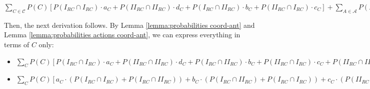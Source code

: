 \documentclass[fleqn,reqno,11pt]{article}
\begin{document}
\noindent $\sum_{C \in \mathcal{C}}P(C)[P(I_{RC}\cap I_{RC})\cdot a_{C}+P(II_{RC}\cap II_{RC})\cdot d_{C}+P(I_{RC}\cap II_{RC})\cdot b_{C}+P(II_{RC}\cap I_{RC})\cdot c_{C}]+\sum_{A \in \mathcal{A}}P(A)[P(I_{RA}\cap I_{RA})\cdot a_{A}+P(II_{RA}\cap II_{RA})\cdot d_{A}+P(I_{RA}\cap II_{RA})\cdot b_{A}+P(II_{RA}\cap I_{RA})\cdot c_{A}] > \sum_{C \in \mathcal{C}}P(C)[P(I_{RC}\cap I_{MC})\cdot a_{C}+P(II_{RC}\cap II_{MC})\cdot d_{C}+P(I_{RC}\cap II_{MC})\cdot c_{C}+P(II_{RC}\cap I_{MC})\cdot b_{C}]+\sum_{A \in \mathcal{A}}P(A)[P(I_{RA}\cap I_{MA})\cdot a_{A}+P(II_{RA}\cap II_{MA})\cdot d_{A}+P(I_{RA}\cap II_{MA})\cdot c_{A}+P(II_{RA}\cap I_{MA})\cdot b_{A}]$
\medskip{}

\noindent Then, the next derivation follows. By Lemma \ref{lemma:probabilities coord-ant} and Lemma \ref{lemma:probabilities actions coord-ant}, we can express
everything in terms of $C$ only:
\begin{itemize}


\item $\sum_{C}P(C)[P(I_{RC}\cap I_{RC})\cdot a_{C}+P(II_{RC}\cap II_{RC})\cdot d_{C}+P(I_{RC}\cap II_{RC})\cdot b_{C}+P(II_{RC}\cap I_{RC})\cdot c_{C} +P(II_{RC}\cap II_{RC})\cdot c_{C}+P(I_{RC}\cap I_{RC})\cdot b_{C}+P(II_{RC}\cap I_{RC})\cdot d_{C}+P(I_{RC}\cap II_{RC})\cdot a_{C}] > \sum_{C}P(C)[P(I_{RC}\cap I_{MC})\cdot a_{C}+P(II_{RC}\cap II_{MC})\cdot d_{C}+P(I_{RC}\cap II_{MC})\cdot c_{C}+P(II_{RC}\cap I_{MC})\cdot b_{C}+P(II_{RC}\cap II_{MC})\cdot c_{C}+P(I_{RC}\cap I_{MC})\cdot b_{C}+P(II_{RC}\cap I_{MC})\cdot a_{C}+P(I_{RC}\cap II_{MC})\cdot d_{C}]$

\item $\sum_{C}P(C)[a_{C} \cdot (P(I_{RC}\cap I_{RC}) + P(I_{RC}\cap II_{RC})) + b_{C} \cdot  (P(I_{RC}\cap II_{RC}) + P(I_{RC}\cap I_{RC})) + c_{C} \cdot (P(II_{RC}\cap I_{RC}) +P(II_{RC}\cap II_{RC})) + d_{C} \cdot (P(II_{RC}\cap II_{RC})+P(II_{RC}\cap I_{RC}))]> \sum_{C}P(C)[a_{C} \cdot (P(I_{RC}\cap I_{MC})+P(II_{RC}\cap I_{MC})) + b_{C} \cdot (P(II_{RC}\cap I_{MC})+P(I_{RC}\cap I_{MC})) + c_{C} \cdot (P(I_{RC}\cap II_{MC})+P(II_{RC}\cap II_{MC})) + d_{C} \cdot (P(II_{RC}\cap II_{MC})+P(I_{RC}\cap II_{MC}))]$

\end{itemize}
\end{document}

